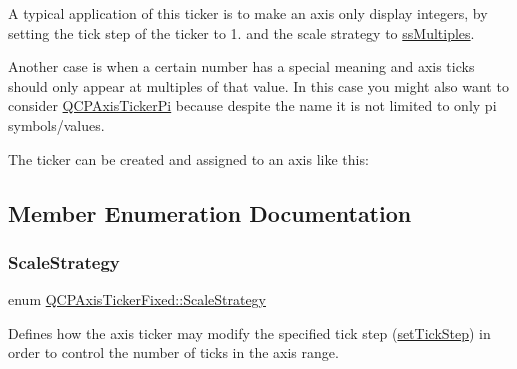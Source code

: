 A typical application of this ticker is to make an axis only display integers, by setting the tick step of the ticker to 1. and the scale strategy to \hyperlink{class_q_c_p_axis_ticker_fixed_a15b3d38b935d404b1311eb85cfb6a439a410f5c537f577b9dda33cb0152b756c6}{ss\+Multiples}.

Another case is when a certain number has a special meaning and axis ticks should only appear at multiples of that value. In this case you might also want to consider \hyperlink{class_q_c_p_axis_ticker_pi}{Q\+C\+P\+Axis\+Ticker\+Pi} because despite the name it is not limited to only pi symbols/values.

The ticker can be created and assigned to an axis like this\+: 
\begin{DoxyCodeInclude}
\end{DoxyCodeInclude}


\subsection{Member Enumeration Documentation}
\mbox{\label{class_q_c_p_axis_ticker_fixed_a15b3d38b935d404b1311eb85cfb6a439}} 
\subsubsection{\texorpdfstring{Scale\+Strategy}{ScaleStrategy}\hspace{0.1cm}{\footnotesize\ttfamily [1/2]}}
{\footnotesize\ttfamily enum \hyperlink{class_q_c_p_axis_ticker_fixed_a15b3d38b935d404b1311eb85cfb6a439}{Q\+C\+P\+Axis\+Ticker\+Fixed\+::\+Scale\+Strategy}}

Defines how the axis ticker may modify the specified tick step (\hyperlink{class_q_c_p_axis_ticker_fixed_a4bc83d85a4f81d4abdd3fa5042d7b833}{set\+Tick\+Step}) in order to control the number of ticks in the axis range.

